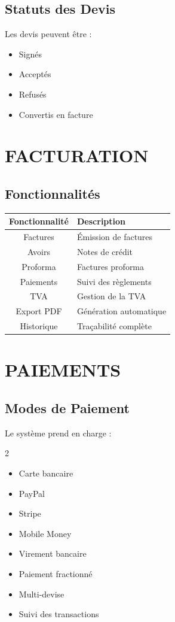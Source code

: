 \documentclass[12pt,a4paper,oneside]{book}
\begin{document}
\section{Statuts des Devis}
Les devis peuvent être :
\begin{itemize}
\item Signés
\item Acceptés
\item Refusés
\item Convertis en facture
\end{itemize}

\chapter{FACTURATION}

\section{Fonctionnalités}
\begin{center}
\begin{tabular}{|c|p{10cm}|}
\hline
\rowcolor{electronpurple}
\color{white}\textbf{Fonctionnalité} & \color{white}\textbf{Description} \\
\hline
Factures & Émission de factures \\
\hline
Avoirs & Notes de crédit \\
\hline
Proforma & Factures proforma \\
\hline
Paiements & Suivi des règlements \\
\hline
TVA & Gestion de la TVA \\
\hline
Export PDF & Génération automatique \\
\hline
Historique & Traçabilité complète \\
\hline
\end{tabular}
\end{center}

\chapter{PAIEMENTS}

\section{Modes de Paiement}
Le système prend en charge :
\begin{multicols}{2}
\begin{itemize}
\item Carte bancaire
\item PayPal
\item Stripe
\item Mobile Money
\item Virement bancaire
\item Paiement fractionné
\item Multi-devise
\item Suivi des transactions
\end{itemize}
\end{multicols}
\end{document}
